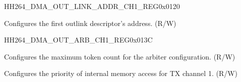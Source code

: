 \begin{register}{H}{H264\_DMA\_OUT\_LINK\_ADDR\_CH1\_REG}{0x0120}\label{regdesc:H264DMAOUTLINKADDRCH1REG}
%
\regnewline%
\begin{regdesc}\begin{reglist}
\label{fielddesc:H264DMAOUTLINKADDRCH1}\item [H264\_DMA\_OUTLINK\_ADDR\_CH1] Configures the first outlink descriptor's address. (R/W)
\end{reglist}\end{regdesc}
\end{register}


\begin{register}{H}{H264\_DMA\_OUT\_ARB\_CH1\_REG}{0x013C}\label{regdesc:H264DMAOUTARBCH1REG}
%
%
%
%
\regnewline%
\begin{regdesc}\begin{reglist}
\label{fielddesc:H264DMAOUTARBTOKENNUMCH1}\item [H264\_DMA\_OUT\_ARB\_TOKEN\_NUM\_CH1] Configures the maximum token count for the arbiter configuration. (R/W)
\label{fielddesc:H264DMAINTEROUTARBPRIORITYCH1}\item [H264\_DMA\_INTER\_OUT\_ARB\_PRIORITY\_CH1] Configures the priority of internal memory access for TX channel 1. (R/W)
\end{reglist}\end{regdesc}
\end{register}




